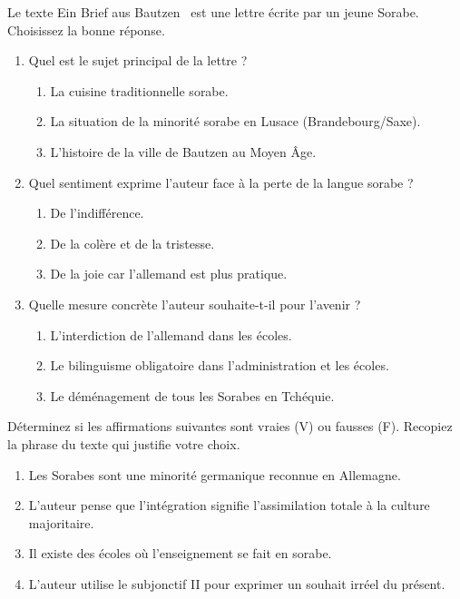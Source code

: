 \documentclass[11pt]{article}
\begin{document}
\begin{exercice}
Le texte \guillemotleft Ein Brief aus Bautzen \guillemotright\ est une lettre écrite par un jeune Sorabe. Choisissez la bonne réponse.
\begin{enumerate}
    \item Quel est le sujet principal de la lettre ?
    \begin{enumerate}
        \item La cuisine traditionnelle sorabe.
        \item La situation de la minorité sorabe en Lusace (Brandebourg/Saxe).
        \item L'histoire de la ville de Bautzen au Moyen Âge.
    \end{enumerate}
    \item Quel sentiment exprime l'auteur face à la perte de la langue sorabe ?
    \begin{enumerate}
        \item De l'indifférence.
        \item De la colère et de la tristesse.
        \item De la joie car l'allemand est plus pratique.
    \end{enumerate}
    \item Quelle mesure concrète l'auteur souhaite-t-il pour l'avenir ?
    \begin{enumerate}
        \item L'interdiction de l'allemand dans les écoles.
        \item Le bilinguisme obligatoire dans l'administration et les écoles.
        \item Le déménagement de tous les Sorabes en Tchéquie.
    \end{enumerate}
\end{enumerate}
\end{exercice}

\begin{exercice}
Déterminez si les affirmations suivantes sont vraies (V) ou fausses (F). Recopiez la phrase du texte qui justifie votre choix.
\begin{enumerate}
    \item Les Sorabes sont une minorité germanique reconnue en Allemagne.
    \item L'auteur pense que l'intégration signifie l'assimilation totale à la culture majoritaire.
    \item Il existe des écoles où l'enseignement se fait en sorabe.
    \item L'auteur utilise le subjonctif II pour exprimer un souhait irréel du présent.
\end{enumerate}
\end{exercice}
\end{document}

